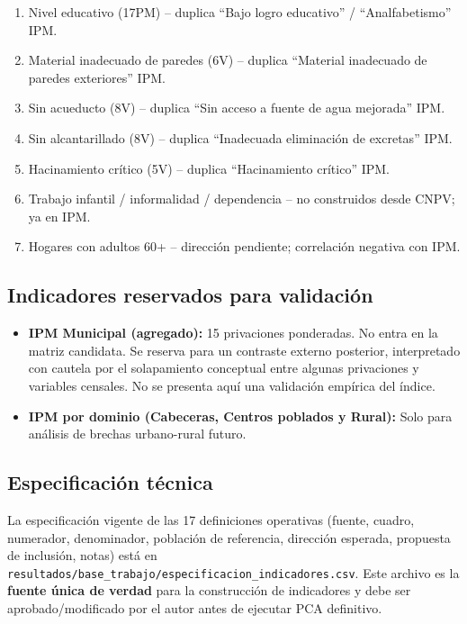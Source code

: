 \begin{enumerate}
    \item Nivel educativo (17PM) -- duplica ``Bajo logro educativo'' / ``Analfabetismo'' IPM.
    \item Material inadecuado de paredes (6V) -- duplica ``Material inadecuado de paredes exteriores'' IPM.
    \item Sin acueducto (8V) -- duplica ``Sin acceso a fuente de agua mejorada'' IPM.
    \item Sin alcantarillado (8V) -- duplica ``Inadecuada eliminación de excretas'' IPM.
    \item Hacinamiento crítico (5V) -- duplica ``Hacinamiento crítico'' IPM.
    \item Trabajo infantil / informalidad / dependencia -- no construidos desde CNPV; ya en IPM.
    \item Hogares con adultos 60+ -- dirección pendiente; correlación negativa con IPM.
\end{enumerate}

\subsection{Indicadores reservados para validación}
\label{sec:indicadores_validacion}

\begin{itemize}
    \item \textbf{IPM Municipal (agregado):} 15 privaciones ponderadas. No entra en la matriz candidata. Se reserva para un contraste externo posterior, interpretado con cautela por el solapamiento conceptual entre algunas privaciones y variables censales. No se presenta aquí una validación empírica del índice.
    \item \textbf{IPM por dominio (Cabeceras, Centros poblados y Rural):} Solo para análisis de brechas urbano-rural futuro.
\end{itemize}

\subsection{Especificación técnica}
\label{sec:especificacion_tecnica}

La especificación vigente de las 17 definiciones operativas (fuente, cuadro, numerador, denominador, población de referencia, dirección esperada, propuesta de inclusión, notas) está en \texttt{resultados/base\_trabajo/especificacion\_indicadores.csv}. Este archivo es la \textbf{fuente única de verdad} para la construcción de indicadores y debe ser aprobado/modificado por el autor antes de ejecutar PCA definitivo.


